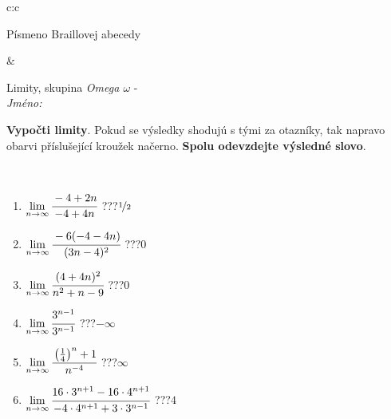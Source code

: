 \documentclass[10pt]{report}
\begin{document}
\begin{tabular}{c:c}
\begin{minipage}[c][104.5mm][t]{0.5\linewidth}
\begin{center}
\begin{minipage}{0.20\linewidth}
\begin{center}
{\small Písmeno Braillovej abecedy}
\end{center}
\end{minipage}
\end{center}
\end{minipage}
&
\begin{minipage}[c][104.5mm][t]{0.5\linewidth}
\begin{center}
\vspace{7mm}
{\huge Limity, skupina \textit{Omega $\omega$} -}\\[5mm]
\textit{Jméno:}\phantom{xxxxxxxxxxxxxxxxxxxxxxxxxxxxxxxxxxxxxxxxxxxxxxxxxxxxxxxxxxxxxxxxx}\\[5mm]
\begin{minipage}{0.95\linewidth}
\begin{center}
\textbf{Vypočti limity}. Pokud se výsledky shodujú s tými za otazníky, tak napravo\\obarvi příslušející kroužek načerno. \textbf{Spolu odevzdejte výsledné slovo}.
\end{center}
\end{minipage}
\\[1mm]
\begin{minipage}{0.79\linewidth}
\begin{center}
\begin{varwidth}{\linewidth}
\begin{enumerate}
\normalsize
\item $\lim\limits_{n\to\infty}\cfrac{-4+2n}{-4+4n}$\quad \dotfill\; ???\;\dotfill \quad $\nicefrac{1}{2}$
\item $\lim\limits_{n\to\infty}\cfrac{-6(-4-4n)}{(3n-4)^2}$\quad \dotfill\; ???\;\dotfill \quad $0$
\item $\lim\limits_{n\to\infty}\cfrac{(4+4n)^2}{n^2+n-9}$\quad \dotfill\; ???\;\dotfill \quad $0$
\item $\lim\limits_{n\to\infty}\cfrac{3^{n-1}}{3^{n-1}}$\quad \dotfill\; ???\;\dotfill \quad $-\infty$
\item $\lim\limits_{n\to\infty}\cfrac{\left(\frac{1}{4}\right)^n +1}{n^{-4}}$\quad \dotfill\; ???\;\dotfill \quad $\infty$
\item $\lim\limits_{n\to\infty}\cfrac{16\cdot 3^{n+1}-16\cdot 4^{n+1}}{-4\cdot 4^{n+1}+3\cdot 3^{n-1}}$\quad \dotfill\; ???\;\dotfill \quad $4$
\end{enumerate}
\end{varwidth}
\end{center}
\end{minipage}
\begin{minipage}{0.20\linewidth}

\end{minipage}
\end{center}
\end{minipage}
\end{tabular}
\end{document}
